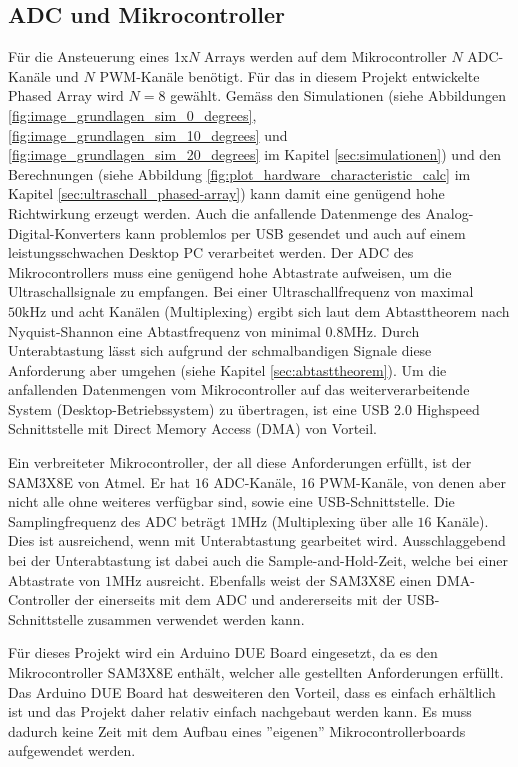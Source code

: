 \subsection{ADC und Mikrocontroller}\label{sec:adc_und_mikrocontroller}
Für die Ansteuerung eines 1x$N$ Arrays werden auf dem Mikrocontroller $N$ ADC-Kanäle und $N$ PWM-Kanäle benötigt. Für das in diesem Projekt entwickelte Phased Array wird $N = 8$  gewählt. Gemäss den Simulationen (siehe Abbildungen \ref{fig:image_grundlagen_sim_0_degrees}, \ref{fig:image_grundlagen_sim_10_degrees} und \ref{fig:image_grundlagen_sim_20_degrees} im Kapitel \ref{sec:simulationen}) und den Berechnungen (siehe Abbildung \ref{fig:plot_hardware_characteristic_calc} im Kapitel \ref{sec:ultraschall_phased-array}) kann damit eine genügend hohe Richtwirkung erzeugt werden. Auch die anfallende Datenmenge des Analog-Digital-Konverters kann problemlos per USB gesendet und auch auf einem leistungsschwachen Desktop PC verarbeitet werden. Der ADC des Mikrocontrollers muss eine genügend hohe Abtastrate aufweisen, um die Ultraschallsignale zu empfangen. Bei einer Ultraschallfrequenz von maximal $50 \mathrm{kHz}$ und acht Kanälen (Multiplexing) ergibt sich laut dem Abtasttheorem nach Nyquist-Shannon eine Abtastfrequenz von minimal $0.8 \mathrm{MHz}$. Durch Unterabtastung lässt sich aufgrund der schmalbandigen Signale diese Anforderung aber umgehen (siehe Kapitel \ref{sec:abtasttheorem}). Um die anfallenden Datenmengen vom Mikrocontroller auf das weiterverarbeitende System (Desktop-Betriebssystem) zu übertragen, ist eine USB 2.0 Highspeed Schnittstelle mit Direct Memory Access (DMA) von Vorteil.

Ein verbreiteter Mikrocontroller, der all diese Anforderungen erfüllt, ist der SAM3X8E von Atmel. Er hat $16$ ADC-Kanäle, $16$ PWM-Kanäle, von denen aber nicht alle ohne weiteres verfügbar sind, sowie eine USB-Schnittstelle. Die Samplingfrequenz des ADC beträgt $1 \mathrm{MHz}$ (Multiplexing über alle $16$ Kanäle). Dies ist ausreichend, wenn mit Unterabtastung gearbeitet wird. Ausschlaggebend bei der Unterabtastung ist dabei auch die Sample-and-Hold-Zeit, welche bei einer Abtastrate von $1 \mathrm{MHz}$ ausreicht. Ebenfalls weist der SAM3X8E einen DMA-Controller der einerseits mit dem ADC und andererseits mit der USB-Schnittstelle zusammen verwendet werden kann.

Für dieses Projekt wird ein Arduino DUE Board eingesetzt, da es den Mikrocontroller SAM3X8E enthält, welcher alle gestellten Anforderungen erfüllt. Das Arduino DUE Board hat desweiteren den Vorteil, dass es einfach erhältlich ist und das Projekt daher relativ einfach nachgebaut werden kann. Es muss dadurch keine Zeit mit dem Aufbau eines ''eigenen'' Mikrocontrollerboards aufgewendet werden.



